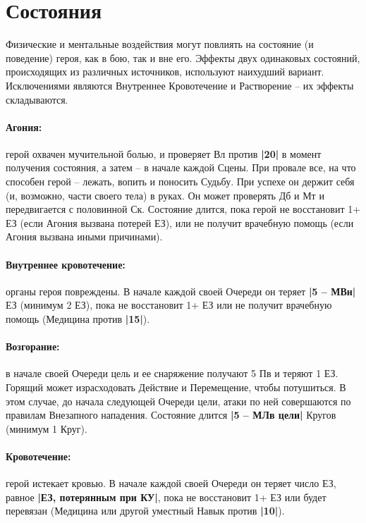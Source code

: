 \section{Состояния}
Физические и ментальные воздействия могут повлиять на состояние (и поведение) героя, как в бою, так и вне его. Эффекты двух одинаковых состояний, происходящих из различных источников, используют наихудший вариант.
\newline Исключениями являются Внутреннее Кровотечение и Растворение – их эффекты складываются.
\paragraph{Агония:} герой охвачен мучительной болью, и проверяет Вл против \textbf{|20|} в момент получения состояния, а затем – в начале каждой Сцены. 
\newline При провале все, на что способен герой – лежать, вопить и поносить Судьбу. При успехе он держит себя (и, возможно, части своего тела) в руках. Он может проверять Дб и Мт и передвигается с половинной Ск. 
\newline Состояние длится, пока герой не восстановит 1+ ЕЗ (если Агония вызвана потерей ЕЗ), или не получит врачебную помощь (если Агония вызвана иными причинами). 
\paragraph{Внутреннее кровотечение:} органы героя повреждены. В начале каждой своей Очереди он теряет \textbf{|5 – МВн|} ЕЗ (минимум 2 ЕЗ), пока не восстановит 1+ ЕЗ или не получит врачебную помощь (Медицина против \textbf{|15|}).
\paragraph{Возгорание:} в начале своей Очереди цель и ее снаряжение получают 5 Пв и теряют 1 ЕЗ. Горящий может израсходовать Действие и Перемещение, чтобы потушиться. В этом случае, до начала следующей Очереди цели, атаки по ней совершаются по правилам Внезапного нападения.
\newline Состояние длится \textbf{|5 – МЛв цели|} Кругов (минимум 1 Круг).
\paragraph{Кровотечение:} герой истекает кровью. В начале каждой своей Очереди он теряет число ЕЗ, равное \textbf{|ЕЗ, потерянным при КУ|}, пока не восстановит 1+ ЕЗ или будет перевязан (Медицина или другой уместный Навык против \textbf{|10|}). 

